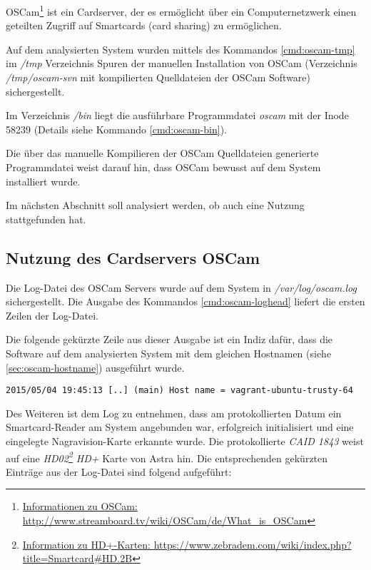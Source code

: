 OSCam\footnote{\href{http://www.streamboard.tv/wiki/OSCam/de/What\_is\_OSCam}{Informationen zu OSCam: http://www.streamboard.tv/wiki/OSCam/de/What\_is\_OSCam}} ist ein Cardserver, der es ermöglicht über ein Computernetzwerk einen geteilten Zugriff auf Smartcards (card sharing) zu ermöglichen.

Auf dem analysierten System wurden mittels des Kommandos \autoref{cmd:oscam-tmp} im \textit{/tmp} Verzeichnis Spuren der manuellen Installation von OSCam (Verzeichnis \textit{/tmp/oscam-svn} mit kompilierten Quelldateien der OSCam Software) sichergestellt. 

Im Verzeichnis \textit{/bin} liegt die ausführbare Programmdatei \textit{oscam} mit der Inode 58239 (Details siehe Kommando \autoref{cmd:oscam-bin}).

Die über das manuelle Kompilieren der OSCam Quelldateien generierte Programmdatei weist darauf hin, dass OSCam bewusst auf dem System installiert wurde. 

Im nächsten Abschnitt soll analysiert werden, ob auch eine Nutzung stattgefunden hat.

\subsection{Nutzung des Cardservers OSCam}

Die Log-Datei des OSCam Servers wurde auf dem System in \textit{/var/log/oscam.log} sichergestellt. Die Ausgabe des Kommandos \autoref{cmd:oscam-loghead} liefert die ersten Zeilen der Log-Datei.

Die folgende gekürzte Zeile aus dieser Ausgabe ist ein Indiz dafür, dass die Software auf dem analysierten System mit dem gleichen Hostnamen (siehe \autoref{sec:oscam-hostname}) ausgeführt wurde.

\begin{verbatim}
2015/05/04 19:45:13 [..] (main) Host name = vagrant-ubuntu-trusty-64
\end{verbatim}

Des Weiteren ist dem Log zu entnehmen, dass am protokollierten Datum ein Smartcard-Reader am System angebunden war, erfolgreich initialisiert und eine eingelegte Nagravision-Karte erkannte wurde. Die protokollierte \textit{CAID 1843} weist auf eine \textit{HD02\footnote{\href{https://www.zebradem.com/wiki/index.php?title=Smartcard\#HD.2B}{Information zu HD+-Karten: https://www.zebradem.com/wiki/index.php?title=Smartcard\#HD.2B}} HD+} Karte von Astra hin. Die entsprechenden gekürzten Einträge aus der Log-Datei sind folgend aufgeführt:

